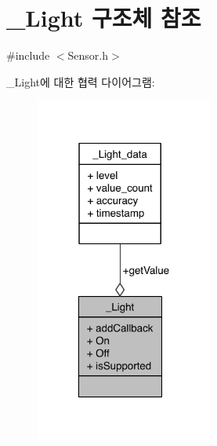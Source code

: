 \hypertarget{struct___light}{\section{\-\_\-\-Light 구조체 참조}
\label{struct___light}
}


{\ttfamily \#include $<$Sensor.\-h$>$}



\-\_\-\-Light에 대한 협력 다이어그램\-:
\nopagebreak
\begin{figure}[H]
\begin{center}
\leavevmode
\includegraphics[width=166pt]{dc/d0a/struct___light__coll__graph}
\end{center}
\end{figure}
